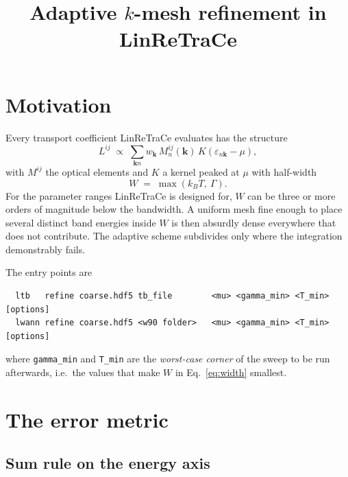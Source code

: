 \documentclass[11pt,a4paper]{article}
\title{Adaptive $k$-mesh refinement in LinReTraCe}
\author{}
\date{}
\newcommand{\kk}{\mathbf{k}}
\newcommand{\code}[1]{\texttt{#1}}
\begin{document}
\maketitle

\section{Motivation}

Every transport coefficient LinReTraCe evaluates has the structure
\begin{equation}
  L^{ij} \;\propto\; \sum_{\kk n} w_{\kk}\, M^{ij}_{n}(\kk)\,
                     K\!\left(\varepsilon_{n\kk}-\mu\right),
  \label{eq:transport}
\end{equation}
with $M^{ij}$ the optical elements and $K$ a kernel peaked at $\mu$ with
half-width
\begin{equation}
  W \;=\; \max\!\left(k_B T,\ \Gamma\right).
  \label{eq:width}
\end{equation}
For the parameter ranges LinReTraCe is designed for, $W$ can be three or more
orders of magnitude below the bandwidth. A uniform mesh fine enough to place
several distinct band energies inside $W$ is then absurdly dense everywhere
that does not contribute. The adaptive scheme subdivides only where the
integration demonstrably fails.

The entry points are
\begin{verbatim}
  ltb   refine coarse.hdf5 tb_file        <mu> <gamma_min> <T_min> [options]
  lwann refine coarse.hdf5 <w90 folder>   <mu> <gamma_min> <T_min> [options]
\end{verbatim}
where \code{gamma\_min} and \code{T\_min} are the \emph{worst-case corner} of
the sweep to be run afterwards, i.e.\ the values that make $W$ in
Eq.~\eqref{eq:width} smallest.

\section{The error metric}
\label{sec:metric}

\subsection{Sum rule on the energy axis}
\end{document}

